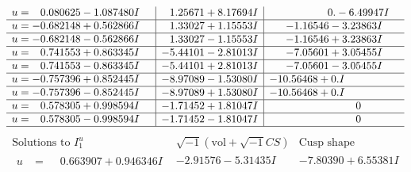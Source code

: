 \documentclass[1p]{elsarticle_modified}
\theoremstyle{definition}
\newcommand{\I}{\sqrt{-1}}
\begin{document}
$$\begin{array}{c|c|c}
\begin{aligned}
u &= \phantom{-}0.080625 - 1.087480 I\end{aligned}
 & \phantom{-}1.25671 + 8.17694 I & \phantom{-0.000000 } 0. - 6.49947 I \\ \hline\begin{aligned}
u &= -0.682148 + 0.562866 I\end{aligned}
 & \phantom{-}1.33027 + 1.15553 I & -1.16546 - 3.23863 I \\ \hline\begin{aligned}
u &= -0.682148 - 0.562866 I\end{aligned}
 & \phantom{-}1.33027 - 1.15553 I & -1.16546 + 3.23863 I \\ \hline\begin{aligned}
u &= \phantom{-}0.741553 + 0.863345 I\end{aligned}
 & -5.44101 - 2.81013 I & -7.05601 + 3.05455 I \\ \hline\begin{aligned}
u &= \phantom{-}0.741553 - 0.863345 I\end{aligned}
 & -5.44101 + 2.81013 I & -7.05601 - 3.05455 I \\ \hline\begin{aligned}
u &= -0.757396 + 0.852445 I\end{aligned}
 & -8.97089 - 1.53080 I & -10.56468 + 0. I\phantom{ +0.000000I} \\ \hline\begin{aligned}
u &= -0.757396 - 0.852445 I\end{aligned}
 & -8.97089 + 1.53080 I & -10.56468 + 0. I\phantom{ +0.000000I} \\ \hline\begin{aligned}
u &= \phantom{-}0.578305 + 0.998594 I\end{aligned}
 & -1.71452 + 1.81047 I & \phantom{-0.000000 } 0 \\ \hline\begin{aligned}
u &= \phantom{-}0.578305 - 0.998594 I\end{aligned}
 & -1.71452 - 1.81047 I & \phantom{-0.000000 } 0\\
 \hline 
 \end{array}$$\newpage$$\begin{array}{c|c|c}  
\text{Solutions to }I^u_{1}& \I (\text{vol} + \sqrt{-1}CS) & \text{Cusp shape}\\
 \hline 
\begin{aligned}
u &= \phantom{-}0.663907 + 0.946346 I\end{aligned}
 & -2.91576 - 5.31435 I & -7.80390 + 6.55381 I \\ \hline\begin{aligned}

\end{aligned}
\end{array}$$
\end{document}
